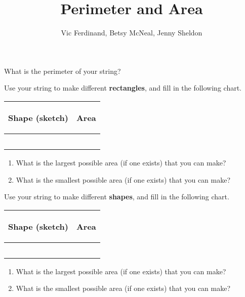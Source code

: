 \documentclass[nooutcomes]{ximera}
\title{Perimeter and Area}
\author{Vic Ferdinand, Betsy McNeal, Jenny Sheldon}
\begin{document}
\begin{abstract}\end{abstract}
\maketitle



\begin{problem}
What is the perimeter of your string?  \end{problem}

\begin{problem} Use your string to make different {\bf rectangles}, and fill in the following chart.
\vskip 0.1in
\begin{tabular}{|p{2.2in}|p{2.2in}|}
\hline
\begin{center} Shape (sketch) \end{center} & \begin{center} Area \end{center}  \\ \hline
 & \\ [10ex] \hline
 & \\ [10 ex] \hline
 & \\ [10 ex] \hline
 & \\ [10 ex] \hline
 & \\ [10 ex] \hline
\end{tabular}
\begin{enumerate}

\item What is the largest possible area (if one exists) that you can make?
\item What is the smallest possible area (if one exists) that you can make?
\end{enumerate}

\end{problem}
\newpage
\begin{problem} Use your string to make different {\bf shapes}, and fill in the following chart.
\vskip 0.1in
\begin{tabular}{|p{2.2in}|p{2.2in}|}
\hline
\begin{center} Shape (sketch) \end{center} & \begin{center} Area \end{center}  \\ \hline
 & \\ [10ex] \hline
 & \\ [10 ex] \hline
 & \\ [10 ex] \hline
 & \\ [10 ex] \hline
 & \\ [10 ex] \hline
\end{tabular}

\begin{enumerate}

\item What is the largest possible area (if one exists) that you can make?
\item What is the smallest possible area (if one exists) that you can make?
\end{enumerate}
\end{problem}
\end{document}
